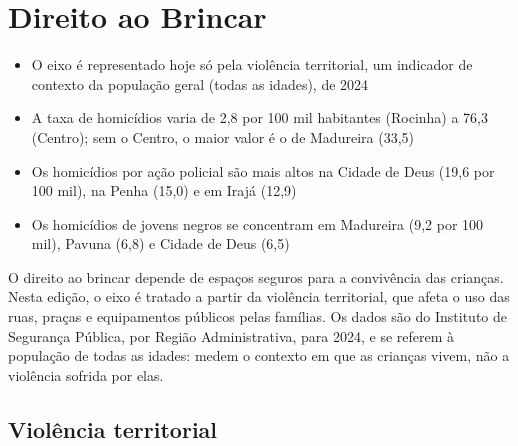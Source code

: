 
\chapter{Direito ao Brincar}\label{cap:eixo-5}

\begin{achados}\begin{itemize}

\item O eixo é representado hoje só pela violência territorial, um indicador de contexto da população geral (todas as idades), de 2024

\item A taxa de homicídios varia de 2,8 por 100 mil habitantes (Rocinha) a 76,3 (Centro); sem o Centro, o maior valor é o de Madureira (33,5)

\item Os homicídios por ação policial são mais altos na Cidade de Deus (19,6 por 100 mil), na Penha (15,0) e em Irajá (12,9)

\item Os homicídios de jovens negros se concentram em Madureira (9,2 por 100 mil), Pavuna (6,8) e Cidade de Deus (6,5)

\end{itemize}\end{achados}

O direito ao brincar depende de espaços seguros para a convivência das crianças. Nesta edição, o eixo é tratado a partir da violência territorial, que afeta o uso das ruas, praças e equipamentos públicos pelas famílias. Os dados são do Instituto de Segurança Pública, por Região Administrativa, para 2024, e se referem à população de todas as idades: medem o contexto em que as crianças vivem, não a violência sofrida por elas.

\section{Violência territorial}

